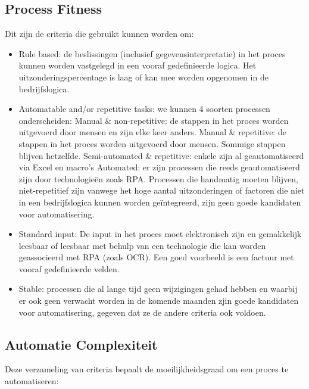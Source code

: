 \subsection{Process Fitness}
Dit zijn de criteria die gebruikt kunnen worden om:
\begin{itemize}
	\item Rule based: de beslissingen (inclusief gegevensinterpretatie) in het proces kunnen worden vastgelegd in een vooraf gedefinieerde logica. Het uitzonderingspercentage is laag of kan mee worden opgenomen in de bedrijfslogica.
	\item Automatable and/or repetitive tasks: we kunnen 4 soorten processen onderscheiden:
		\subitem Manual \& non-repetitive: de stappen in het proces worden uitgevoerd door mensen en zijn elke keer anders.
		\subitem  Manual \& repetitive: de stappen in het proces worden uitgevoerd door mensen. Sommige stappen blijven hetzelfde.
		\subitem  Semi-automated \& repetitive: enkele zijn al geautomatiseerd via Excel en macro's
		\subitem  Automated: er zijn processen die reeds geautomatiseerd zijn door technologieën zoals RPA.
		Processen die handmatig moeten blijven, niet-repetitief zijn vanwege het hoge aantal uitzonderingen of factoren die niet in een bedrijfslogica kunnen worden geïntegreerd, zijn geen goede kandidaten voor automatisering.
		\item Standard input: De input in het proces moet elektronisch zijn en gemakkelijk leesbaar of leesbaar met behulp van een technologie die kan worden geassocieerd met RPA (zoals OCR). Een goed voorbeeld is een factuur met vooraf gedefinieerde velden.
		\item Stable: processen die al lange tijd geen wijzigingen gehad hebben en waarbij er ook geen verwacht worden in de komende maanden zjin goede kandidaten voor automatisering, gegeven dat ze de andere criteria ook voldoen.
\end{itemize}

\subsection{Automatie Complexiteit}
Deze verzameling van criteria bepaalt de moeilijkheidsgraad om een proces te automatiseren:

